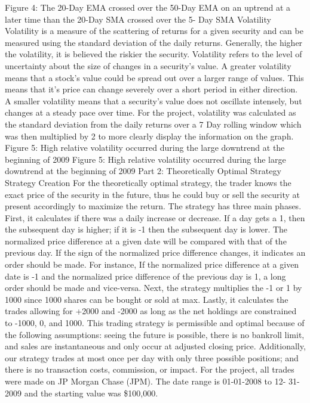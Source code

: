 \documentclass{article}
\begin{document}
Figure 4: The 20-Day EMA crossed over the 50-Day EMA on an uptrend at a later time than the 20-Day SMA crossed over the 5- Day SMA
Volatility
Volatility is a measure of the scattering of returns for a given security and can be measured using the standard deviation of the daily returns. Generally, the higher the volatility, it is believed the riskier the security. 
Volatility refers to the level of uncertainty about the size of changes in a security's value. A greater volatility means that a stock’s value could be spread out over a larger range of values. This means that it’s price can change severely over a short period in either direction. A smaller volatility means that a security's value does not oscillate intensely, but changes at a steady pace over time. 
For the project, volatility was calculated as the standard deviation from the daily returns over a 7 Day rolling window which was then multiplied by 2 to more clearly display the information on the graph.
Figure 5: High relative volatility occurred during the large downtrend at the beginning of 2009
Figure 5: High relative volatility occurred during the large downtrend at the beginning of 2009
Part 2: Theoretically Optimal Strategy
Strategy Creation
For the theoretically optimal strategy, the trader knows the exact price of the security in the future, thus he could buy or sell the security at present accordingly to maximize the return.
The strategy has three main phases. First, it calculates if there was a daily increase or decrease. If a day gets a 1, then the subsequent day is higher; if it is -1 then the subsequent day is lower. 
The normalized price difference at a given date will be compared with that of the previous day. If the sign of the normalized price difference changes, it indicates an order should be made. For instance, If the normalized price difference at a given date is -1 and the normalized price difference of the previous day is 1, a long order should be made and vice-versa.
Next, the strategy multiplies the -1 or 1 by 1000 since 1000 shares can be bought or sold at max. Lastly, it calculates the trades allowing for +2000 and -2000 as long as the net holdings are constrained to -1000, 0, and 1000.
This trading strategy is permissible and optimal because of the following assumptions: seeing the future is possible, there is no bankroll limit, and sales are instantaneous and only occur at adjusted closing price. Additionally, our strategy trades at most once per day with only three possible positions; and there is no transaction costs, commission, or impact.
For the project, all trades were made on JP Morgan Chase (JPM). The date range is 01-01-2008 to 12- 31-2009 and the starting value was \$100,000.
\end{document}
